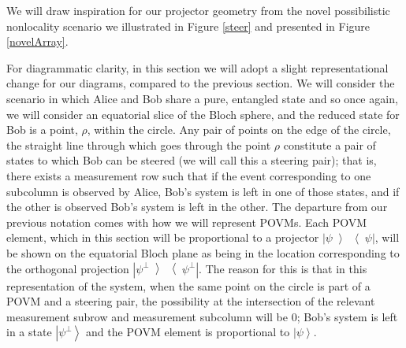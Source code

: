 \documentclass[reprint]{revtex4-1}
\theoremstyle{definition}
\newcommand{\ket}[1]{{\left\vert{#1}\right\rangle}}
\newcommand{\ketbra}[1]{{\left| #1 \middle>\middle< #1 \right|}}
\begin{document}
We will draw inspiration for our projector geometry from the novel possibilistic nonlocality scenario we illustrated in Figure \ref{steer} and presented in Figure \ref{novelArray}. 

For diagrammatic clarity, in this section we will adopt a slight representational change for our diagrams, compared to the previous section. We will consider the scenario in which Alice and Bob share a pure, entangled state and so once again, we will consider an equatorial slice of the Bloch sphere, and the reduced state for Bob is a point, $\rho$, within the circle. Any pair of points on the edge of the circle, the straight line through which goes through the point $\rho$ constitute a pair of states to which Bob can be steered (we will call this a steering pair); that is, there exists a measurement row such that if the event corresponding to one subcolumn is observed by Alice, Bob's system is left in one of those states, and if the other is observed Bob's system is left in the other. The departure from our previous notation comes with how we will represent POVMs. Each POVM element, which in this section will be proportional to a projector $\ketbra{\psi}$, will be shown on the equatorial Bloch plane as being in the location corresponding to the orthogonal projection $\ketbra{\psi^\perp}$. The reason for this is that in this representation of the system, when the same point on the circle is part of a POVM and a steering pair, the possibility at the intersection of the relevant measurement subrow and measurement subcolumn will be 0; Bob's system is left in a state $\ket{\psi^\perp}$ and the POVM element is proportional to $\ket{\psi}$.

\end{document}
